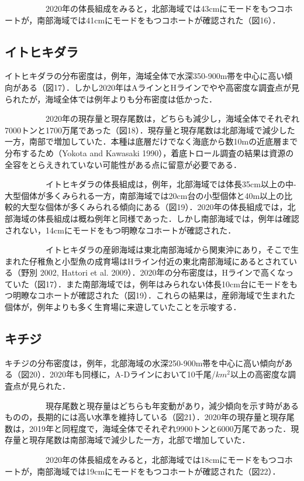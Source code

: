 \documentclass[11pt]{article} %
\begin{document}
\begin{linenumbers}
\ \ \ \ \ \ \ \ \ \ 
2020年の体長組成をみると，北部海域では43cmにモードをもつコホートが，南部海域では41cmにモードをもつコホートが確認された（図16）．


\subsection{イトヒキダラ}
イトヒキダラの分布密度は，例年，海域全体で水深350-900m帯を中心に高い傾向がある（図17）．しかし2020年はAラインとHラインでやや高密度な調査点が見られたが，海域全体では例年よりも分布密度は低かった．

\ \ \ \ \ \ \ \ \ \ 
2020年の現存量と現存尾数は，どちらも減少し，海域全体でそれぞれ7000トンと1700万尾であった（図18）．現存量と現存尾数は北部海域で減少した一方，南部で増加していた．本種は底層だけでなく海底から数10mの近底層まで分布するため（Yokota and Kawasaki 1990），着底トロール調査の結果は資源の全容をとらえきれていない可能性がある点に留意が必要である．

\ \ \ \ \ \ \ \ \ \ 
イトヒキダラの体長組成は，例年，北部海域では体長35cm以上の中-大型個体が多くみられる一方，南部海域では20cm台の小型個体と40m以上の比較的大型な個体が多くみられる傾向にある（図19）．2020年の体長組成では，北部海域の体長組成は概ね例年と同様であった．しかし南部海域では，例年は確認されない，14cmにモードをもつ明瞭なコホートが確認された．

\ \ \ \ \ \ \ \ \ \ 
イトヒキダラの産卵海域は東北南部海域から関東沖にあり，そこで生まれた仔稚魚と小型魚の成育場はHライン付近の東北南部海域にあるとされている（野別 2002, Hattori et al. 2009）．2020年の分布密度は，Hラインで高くなっていた（図17）．また南部海域では，例年はみられない体長10cm台にモードをもつ明瞭なコホートが確認された（図19）．これらの結果は，産卵海域で生まれた個体が，例年よりも多く生育場に来遊していたことを示唆する．


\subsection{キチジ}
キチジの分布密度は，例年，北部海域の水深250-900m帯を中心に高い傾向がある（図20）．2020年も同様に，A-Dラインにおいて10千尾/$km^2$以上の高密度な調査点が見られた．

\ \ \ \ \ \ \ \ \ \ 
現存尾数と現存量はどちらも年変動があり，減少傾向を示す時があるものの，長期的には高い水準を維持している（図21）．2020年の現存量と現存尾数は，2019年と同程度で，海域全体でそれぞれ9900トンと6000万尾であった．現存量と現存尾数は南部海域で減少した一方，北部で増加していた．

\ \ \ \ \ \ \ \ \ \ 
2020年の体長組成をみると，北部海域では18cmにモードをもつコホートが，南部海域では19cmにモードをもつコホートが確認された（図22）．



\end{linenumbers}
\end{document}
